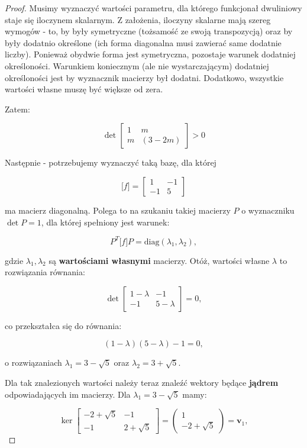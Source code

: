 \documentclass[11pt]{article}
\theoremstyle{definition}
\begin{document}
\begin{proof}
Musimy wyznaczyć wartości parametru, dla którego funkcjonał dwuliniowy staje się iloczynem skalarnym. Z założenia, iloczyny skalarne mają szereg wymogów - to, by były symetryczne (tożsamość ze swoją transpozycją) oraz by były dodatnio określone (ich forma diagonalna musi zawierać same dodatnie liczby). Ponieważ obydwie forma jest symetryczna, pozostaje warunek dodatniej określoności. Warunkiem koniecznym (ale nie wystarczającym) dodatniej określoności jest by wyznacznik macierzy był dodatni. Dodatkowo, wszystkie wartości własne muszę być większe od zera.

Zatem:

$$\det\begin{bmatrix}
    1&m\\
    m&(3-2m)
\end{bmatrix} > 0$$

Następnie - potrzebujemy wyznaczyć taką bazę, dla której 

$$\big[f\big] = \begin{bmatrix}
    1&-1\\
    -1&5
\end{bmatrix}$$

ma macierz diagonalną. Polega to na szukaniu takiej macierzy $P$ o wyznaczniku $\det P=1$, dla której spełniony jest warunek:

$$P^T\big[f\big]P = \text{diag}(\lambda_1, \lambda_2),$$

gdzie $\lambda_1, \lambda_2$ są \textbf{wartościami własnymi} macierzy. Otóż, wartości własne $\lambda$ to rozwiązania równania:

$$\det\begin{bmatrix}
    1-\lambda&-1\\
    -1&5-\lambda
\end{bmatrix} = 0,$$

co przekształca się do równania:

$$(1-\lambda)(5-\lambda)-1=0,$$

o rozwiązaniach $\lambda_1 = 3-\sqrt{5}$ oraz $\lambda_2 = 3+\sqrt{5}$.

Dla tak znalezionych wartości należy teraz znaleźć wektory będące \textbf{jądrem} odpowiadających im macierzy. Dla $\lambda_1=3-\sqrt{5}$ mamy:

$$\ker\begin{bmatrix}-2+\sqrt5 & -1\\-1&2+\sqrt5\end{bmatrix} = \begin{pmatrix}1\\-2+\sqrt{5}\end{pmatrix} = \mathbf v_1,$$


\end{proof}
\end{document}

